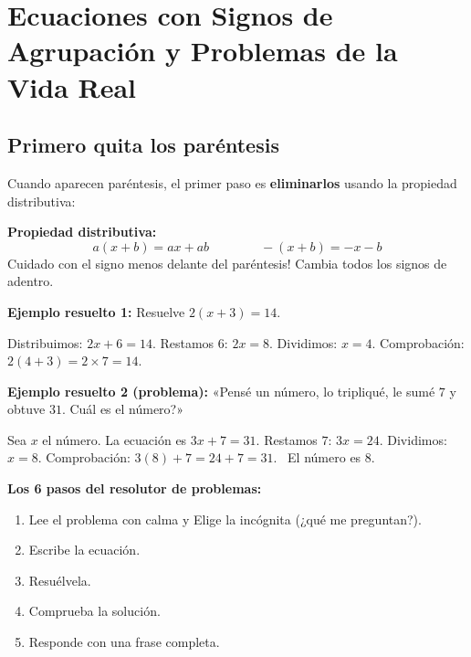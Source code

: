 \documentclass[12pt, letterpaper]{article}
\begin{document}

\section{Ecuaciones con Signos de Agrupación y Problemas de la Vida Real}

\subsection{Primero quita los paréntesis}

Cuando aparecen paréntesis, el primer paso es \textbf{eliminarlos} usando la propiedad distributiva:

\begin{cuadroteoria}
  \textbf{Propiedad distributiva:}
  \[
    a(x + b) = ax + ab \qquad\qquad -(x + b) = -x - b
  \]
  \textquestiondown Cuidado con el signo menos delante del paréntesis! Cambia todos los signos de adentro.
\end{cuadroteoria}

\noindent\textbf{Ejemplo resuelto 1:} Resuelve $2(x + 3) = 14$.

Distribuimos: $2x + 6 = 14$. Restamos $6$: $2x = 8$. Dividimos: $x = 4$.
Comprobación: $2(4 + 3) = 2 \times 7 = 14$. \checkmark

\noindent\textbf{Ejemplo resuelto 2 (problema):} «Pensé un número, lo tripliqué, le sumé $7$ y obtuve $31$. \textquestiondown Cuál es el número?»

Sea $x$ el número. La ecuación es $3x + 7 = 31$. Restamos $7$: $3x = 24$. Dividimos: $x = 8$.
Comprobación: $3(8) + 7 = 24 + 7 = 31$. \checkmark\ El número es $8$.

\begin{cuadrosolucion}
  \textbf{Los 6 pasos del resolutor de problemas:}
  \begin{enumerate}
    \item Lee el problema con calma y Elige la incógnita (¿qué me preguntan?).
    \item Escribe la ecuación.
    \item Resuélvela.
    \item Comprueba la solución.
    \item Responde con una frase completa.
  \end{enumerate}
\end{cuadrosolucion}
\end{document}

